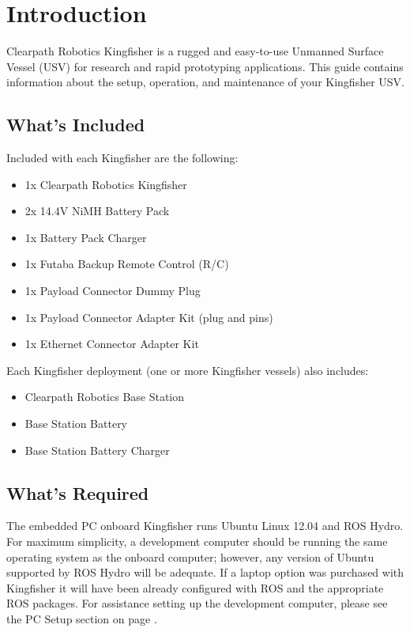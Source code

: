 \documentclass[]{clearpath-latex/clearpath-manual}
\begin{document}
\tableofcontents

\section{Introduction}
Clearpath Robotics Kingfisher is a rugged and easy-to-use Unmanned Surface Vessel (USV) for research and rapid prototyping applications. This guide contains information about the setup, operation, and maintenance of your Kingfisher USV.

\subsection{What's Included}

Included with each Kingfisher are the following:

\begin{itemize}[nolistsep]
	\item 1x Clearpath Robotics Kingfisher
	\item 2x 14.4V NiMH Battery Pack
	\item 1x Battery Pack Charger
	\item 1x Futaba Backup Remote Control (R/C)
	\item 1x Payload Connector Dummy Plug
	\item 1x Payload Connector Adapter Kit (plug and pins)
	\item 1x Ethernet Connector Adapter Kit
\end{itemize}

Each Kingfisher deployment (one or more Kingfisher vessels) also includes:

\begin{itemize}[nolistsep]
	\item Clearpath Robotics Base Station
	\item Base Station Battery
	\item Base Station Battery Charger
\end{itemize}

\subsection{What's Required}

The embedded PC onboard Kingfisher runs Ubuntu Linux 12.04 and ROS Hydro. For maximum simplicity, a development computer should be running the same operating system as the onboard computer; however, any version of Ubuntu supported by ROS Hydro will be adequate. If a laptop option was purchased with Kingfisher it will have been already configured with ROS and the appropriate ROS packages. For assistance setting up the development computer, please see the PC Setup section on page \pageref{pcsetup}.
\end{document}
